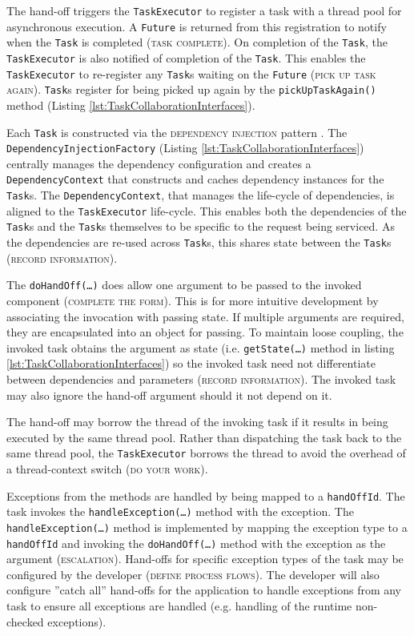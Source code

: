 \documentclass[prodmode]{style/acmlarge}
\begin{document}
The hand-off triggers the \texttt{TaskExecutor} to register a task with a thread
pool for asynchronous execution.  A \texttt{Future} is returned from this
registration to notify when the \texttt{Task} is completed (\textsc{task
complete}).  On completion of the \texttt{Task}, the \texttt{TaskExecutor} is
also notified of completion of the \texttt{Task}.
This enables the \texttt{TaskExecutor} to re-register any \texttt{Task}s waiting
on the \texttt{Future} (\textsc{pick up task again}).  \texttt{Task}s register
for being picked up again by the \texttt{pickUpTaskAgain()} method (Listing
\ref{lst:TaskCollaborationInterfaces}).

Each \texttt{Task} is constructed via the \textsc{dependency injection} pattern
\cite{ioc}.  The \texttt{Dependency\-InjectionFactory} (Listing
\ref{lst:TaskCollaborationInterfaces}) centrally manages the dependency
configuration and creates a \texttt{Depend\-ency\-Context} that constructs and
caches dependency instances for the \texttt{Task}s.  The
\texttt{Dependency\-Context}, that manages the life-cycle of dependencies, is
aligned to the \texttt{TaskExecutor} life-cycle.  This enables both the
dependencies of the \texttt{Task}s and the \texttt{Task}s themselves to be
specific to the request being serviced.  As the dependencies are re-used across
\texttt{Task}s, this shares state between the \texttt{Task}s (\textsc{record
information}).

The \texttt{doHandOff(\ldots)} does allow one argument to be passed to the
invoked component (\textsc{complete the form}).  This is for more intuitive
development by associating the invocation with passing state.  If multiple
arguments are required, they are encapsulated into an object for passing.
To maintain loose coupling, the invoked task obtains the argument as state (i.e.
\texttt{getState(\ldots)} method in listing
\ref{lst:TaskCollaborationInterfaces}) so the invoked task need not
differentiate between dependencies and parameters (\textsc{record information}).
The invoked task may also ignore the hand-off argument should it not depend on
it.

The hand-off may borrow the thread of the invoking task if it results in being
executed by the same thread pool.  Rather than dispatching the task back to the
same thread pool, the \texttt{TaskExecutor} borrows the thread to avoid the
overhead of a thread-context switch (\textsc{do your work}).

Exceptions from the methods are handled by being mapped to a \texttt{handOffId}.
 The task invokes the \texttt{handle\-Excep\-tion(\ldots)} method with the
exception.  The \texttt{handleException(\ldots)} method is implemented by
mapping the exception type to a \texttt{handOffId} and invoking the
\texttt{doHandOff(\ldots)} method with the exception as the argument
(\textsc{escalation}).  Hand-offs for specific exception types of the task may
be configured by the developer (\textsc{define process flows}).  The developer
will also configure ''catch all'' hand-offs for the application to handle
exceptions from any task to ensure all exceptions are handled (e.g. handling of
the runtime non-checked exceptions).
\end{document}
